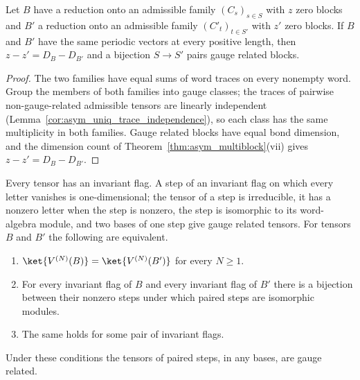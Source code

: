 \begin{lemma}
    \label{thm:asym_arbitrary_family_unique}
    \leanok
    Let $B$ have a reduction onto an admissible family $(C_s)_{s\in S}$ with
    $z$ zero blocks and $B'$ a reduction onto an admissible family
    $(C'_t)_{t\in S'}$ with $z'$ zero blocks. If $B$ and $B'$ have the same
    periodic vectors at every positive length, then $z-z'=D_B-D_{B'}$ and a
    bijection $S\to S'$ pairs gauge related blocks.
\end{lemma}

\begin{proof}
    \leanok
    The two families have equal sums of word traces on every nonempty word.
    Group the members of both families into gauge classes; the traces of
    pairwise non-gauge-related admissible tensors are linearly independent
    (Lemma~\ref{cor:asym_uniq_trace_independence}), so each class has
    the same multiplicity in both families. Gauge related blocks have equal
    bond dimension, and the dimension count of
    Theorem~\ref{thm:asym_multiblock}(vii) gives $z-z'=D_B-D_{B'}$.
\end{proof}

\begin{lemma}
    \label{thm:asym_arbitrary_flags}
    \leanok
    Every tensor has an invariant flag. A step of an invariant flag on which
    every letter vanishes is one-dimensional; the tensor of a step is
    irreducible, it has a nonzero letter when the step is nonzero, the step
    is isomorphic to its word-algebra module, and two bases of one step give
    gauge related tensors. For tensors $B$ and $B'$ the following are
    equivalent.
    \begin{enumerate}
        \item[(i)] $\ket{V^{(N)}(B)}=\ket{V^{(N)}(B')}$ for every $N\geq1$.
        \item[(ii)] For every invariant flag of $B$ and every invariant flag
              of $B'$ there is a bijection between their nonzero steps under
              which paired steps are isomorphic modules.
        \item[(iii)] The same holds for some pair of invariant flags.
    \end{enumerate}
    Under these conditions the tensors of paired steps, in any bases, are
    gauge related.
\end{lemma}

